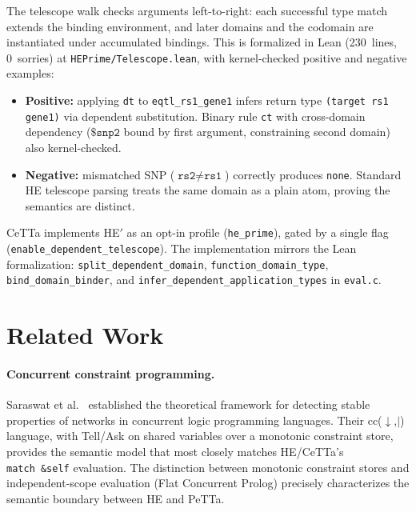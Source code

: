 \documentclass[11pt]{article}
\newcommand{\code}[1]{\texttt{#1}}
\newcommand{\PeTTa}{\textup{PeTTa}}
\newcommand{\HE}{\textup{HE}}
\newcommand{\CeTTa}{\textup{CeTTa}}
\begin{document}
The telescope walk checks arguments left-to-right: each successful
type match extends the binding environment, and later domains and the
codomain are instantiated under accumulated bindings.  This is
formalized in Lean (230~lines, 0~sorries) at
\code{HEPrime/Telescope.lean}, with kernel-checked positive and
negative examples:

\begin{itemize}
\item \textbf{Positive:} applying \code{dt} to \code{eqtl\_rs1\_gene1}
  infers return type \code{(target rs1 gene1)} via dependent
  substitution.  Binary rule \code{ct} with cross-domain dependency
  ($\code{\$snp2}$ bound by first argument, constraining second domain)
  also kernel-checked.
\item \textbf{Negative:} mismatched SNP ($\code{rs2} \neq \code{rs1}$)
  correctly produces \code{none}.  Standard HE telescope parsing treats
  the same domain as a plain atom, proving the semantics are distinct.
\end{itemize}

\CeTTa{} implements HE$'$ as an opt-in profile (\code{he\_prime}),
gated by a single flag (\code{enable\_dependent\_telescope}).  The
implementation mirrors the Lean formalization: \code{split\_dependent\_domain},
\code{function\_domain\_type}, \code{bind\_domain\_binder}, and
\code{infer\_dependent\_application\_types} in \code{eval.c}.

\section{Related Work}

\paragraph{Concurrent constraint programming.}
Saraswat et al.~\cite{saraswat1988} established the theoretical
framework for detecting stable properties of networks in concurrent
logic programming languages.  Their cc($\downarrow$,$|$) language,
with Tell/Ask on shared variables over a monotonic constraint store,
provides the semantic model that most closely matches \HE{}/\CeTTa{}'s
\code{match~\&self} evaluation.  The distinction between monotonic
constraint stores and independent-scope evaluation (Flat Concurrent
Prolog) precisely characterizes the semantic boundary between \HE{} and
\PeTTa{}.
\end{document}
